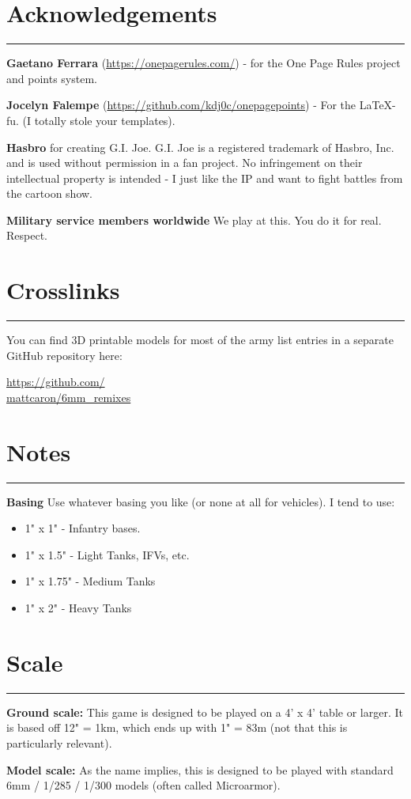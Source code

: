 \documentclass[11pt]{article}
\newcommand{\mysection}[1]{
  \section*{\centering #1}
  \raggedright
  \hrule
  \bigskip

}
\renewenvironment{description}
  {\list{}{\labelwidth=0pt \leftmargin=0pt
   \let\makelabel\descriptionlabel}}
  {\endlist}
\begin{document}
\begin{multicols*}{3}[]
\raggedcolumns

\mysection{Acknowledgements}

\begin{description}
\item {\bf Gaetano Ferrara}
  ({\footnotesize\url{https://onepagerules.com/}}) - for
  the One Page Rules project and points system.
\item {\bf Jocelyn Falempe}
  ({\footnotesize\url{https://github.com/kdj0c/onepagepoints}}) -
For the \LaTeX-fu. (I totally stole your templates).
\item {\bf Hasbro} for creating G.I. Joe. G.I. Joe is a registered trademark of
Hasbro, Inc. and is used without permission in a fan project. No infringement on
their intellectual property is intended - I just like the IP and want to fight
battles from the cartoon show.
\item {\bf Military service members worldwide} We play at this. You do it for
real. Respect.
\end{description}

\mysection{Crosslinks}

You can find 3D printable models for most of the army list entries in a separate
GitHub repository here:

\href{https://github.com/mattcaron/6mm_remixes}{https://github.com/\\mattcaron/6mm\_remixes}

\mysection{Notes}

\begin{description}
\item{\bf Basing} Use whatever basing you like (or none at all for vehicles). I
tend to use:
  \begin{itemize}
    \item 1" x 1" - Infantry bases.
    \item 1" x 1.5" - Light Tanks, IFVs, etc.
    \item 1" x 1.75" - Medium Tanks
    \item 1" x 2" - Heavy Tanks
  \end{itemize}
\end{description}

\mysection{Scale}
\begin{description}
\item {\bf Ground scale:} This game is designed to be played on a 4' x 4' table
or larger.  It is based off 12" = 1km, which ends up with 1" = 83m (not that
this is particularly relevant).
\item{\bf Model scale:} As the name implies, this is designed to be played with
standard 6mm / 1/285 / 1/300 models (often called Microarmor).
\end{description}


\end{multicols*}
\end{document}

